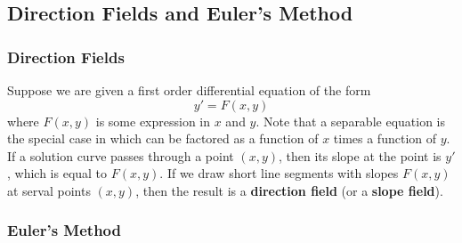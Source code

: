 \subsection{Direction Fields and Euler's Method}

\subsubsection*{Direction Fields}

Suppose we are given a first order differential equation of the form
\[y'=F(x,y)\]
where \(F(x,y)\) is some expression in \(x\) and \(y\).
Note that a separable equation is the special case in which can be factored as
a function of \(x\) times a function of \(y\).
If a solution curve passes through a point \((x,y)\), then its slope at the
point is \(y'\), which is equal to \(F(x,y)\).
If we draw short line segments with slopes \(F(x,y)\) at serval points
\((x,y)\), then the result is a \textbf{direction field} (or a
\textbf{slope field}).

\subsubsection*{Euler's Method}